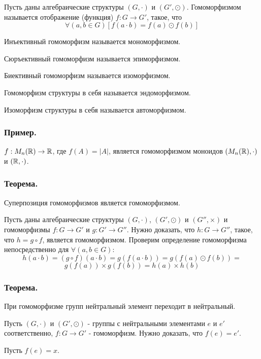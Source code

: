 \opred

Пусть даны алгебраические структуры $(G, \cdot)$ и $(G', \odot)$.
Гомоморфизмом называется отображение (функция) $f:G \to G'$,
такое, что $$\forall(a,b \in G)[f(a \cdot b)=f(a) \odot f(b)]$$

\opred
Инъективный гомоморфизм называется мономорфизмом.

\opred
Сюръективный гомоморфизм называется эпиморфизмом.

\opred
Биективный гомоморфизм называется изоморфизмом.

\opred
Гомоморфизм структуры в себя называется эндоморфизмом.

\opred
Изоморфизм структуры в себя называется автоморфизмом.

\subsubsection{Пример.}

$f:M_n(\mathbb{R}) \to \mathbb{R}$, где $f(A)=|A|$, является гомоморфизмом моноидов $(M_n(\mathbb{R}),\cdot)$ и $(\mathbb{R}, \cdot)$.

\subsubsection{Теорема.}

Суперпозиция гомоморфизмов является гомоморфизмом.

\dokvo

Пусть даны алгебраические структуры $(G,\cdot)$, $(G',\odot)$ и $(G'',\times)$
и гомоморфизмы $f:G \to G'$ и $g:G' \to G''$. Нужно доказать, что $h:G \to G''$, такое, что $h=g\circ f$,
является гомоморфизмом.
Проверим определение гомоморфизма непосредственно для $\forall(a,b \in G)$:
$$
h(a \cdot b) = (g \circ f)(a \cdot b) = g(f(a \cdot b))=g(f(a)\odot f(b)) = 
$$
$$
g(f(a)) \times g(f(b)) = h(a) \times h(b)
$$

\dokno

\subsubsection{Теорема.}

При гомоморфизме групп нейтральный элемент переходит в нейтральный.

\dokvo

Пусть $(G,\cdot)$ и $(G',\odot)$ - группы с нейтральными элементами $e$ и $e'$ соответственно,
$f:G \to G'$ - гомоморфизм.
Нужно доказать, что $f(e)=e'$.

Пусть $f(e)=x$.

